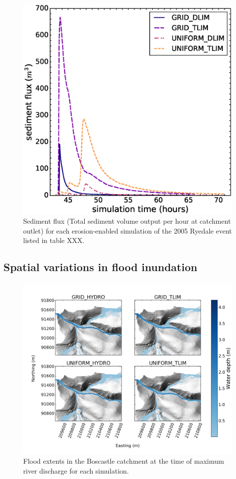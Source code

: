 \begin{figure}[t]
\includegraphics[width=14cm]{chp06_figures_scripts/figure_ryedale_sedigraph_ensemble.eps}
\caption{Sediment flux (Total sediment volume output per hour at catchment outlet) for each erosion-enabled simulation of the 2005 Ryedale event listed in table XXX.}
\label{fig_ryedale_sedigraph_ensemble}
\end{figure}

\subsection{Spatial variations in flood inundation}

\begin{figure}
\includegraphics[width=17cm]{chp06_figures_scripts/figure_boscastle_peak_flood_ensemble.png}
\caption{Flood extents in the Boscastle catchment at the time of maximum river discharge for each simulation.}
\label{fig_boscastle_2dplan_flood_ensemble}
\end{figure}

